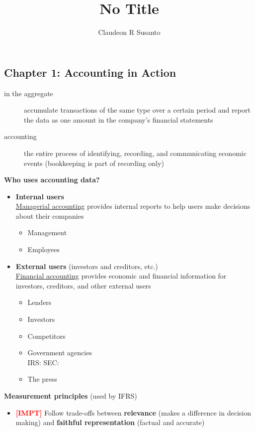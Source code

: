 \documentclass{article}
\title{No Title}
\author{Claudeon R Susanto}
\date{}
\newcommand{\impt}[0]{\textcolor{red}{\textbf{[IMPT] }}}
\begin{document}
{}\selectfont
\begin{multicols}{2}
\section{Chapter 1: Accounting in Action}
\begin{description}
	\item[in the aggregate] accumulate transactions of the same type over a certain period and report the data as one amount in the company's financial statements
	\item[accounting] the entire process of identifying, recording, and communicating economic events (bookkeeping is part of recording only)\\
\end{description}
\textbf{Who uses accounting data?}
\begin{itemize}[topsep=0pt]
	\item \textbf{Internal users}\\
	\underline{Managerial accounting} provides internal reports to help users make decisions about their companies
	\begin{itemize}
		\item Management
		\item Employees
	\end{itemize}
	\item \textbf{External users} (investors and creditors, etc.)\\
	\underline{Financial accounting} provides economic and financial information for investors, creditors, and other external users
	\begin{itemize}
		\item Lenders
		\item Investors
		\item Competitors
		\item Government agencies\\
		IRS:
		SEC:
		\item The press
	\end{itemize}
\end{itemize}
\textbf{Measurement principles} (used by IFRS)
\begin{itemize}
	\item \impt Follow trade-offs between \textbf{relevance} (makes a difference in decision making) and \textbf{faithful representation} (factual and accurate)

\end{itemize}
\end{multicols}
\end{document}
